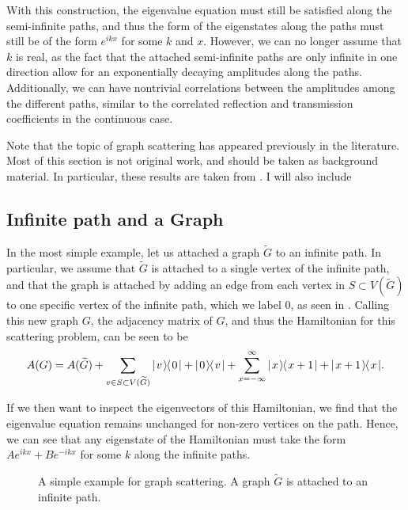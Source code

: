 \documentclass[../thesis-main/thesis-main]{subfiles}
\begin{document}
With this construction, the eigenvalue equation must still be satisfied along the semi-infinite paths, and thus the form of the eigenstates along the paths must still be of the form $e^{i k x}$ for some $k$ and $x$.  However, we can no longer assume that $k$ is real, as the fact that the attached semi-infinite paths are only infinite in one direction allow for an exponentially decaying amplitudes along the paths.  Additionally, we can have nontrivial correlations between the amplitudes among the different paths, similar to the correlated reflection and transmission coefficients in the continuous case.

Note that the topic of graph scattering has appeared previously in the literature.  Most of this section is not original work, and should be taken as background material.  In particular, these results are taken from \cite{FGG08, Chi09, CS11, CG12}.  I will also include 


\subsection{Infinite path and a Graph}\label{sec:infinite_path_and_graph}

In the most simple example, let us attached a graph $\widetilde{G}$ to an infinite path.  In particular, we assume that $\widetilde{G}$ is attached to a single vertex of the infinite path, and that the graph is attached by adding an edge from each vertex in $S\subset V(\widetilde{G})$ to one specific vertex of the infinite path, which we label $0$, as seen in .  Calling this new graph $G$, the adjacency matrix of $G$, and thus the Hamiltonian for this scattering problem, can be seen to be
\begin{equation}
  A(G) = A(\widetilde{G}) + \sum_{v\in S \subset V(\widetilde{G})} |\mspace{2mu} v \mspace{2mu} \rangle\mspace{-2mu}\langle\mspace{2mu} 0 \mspace{2mu} | + |\mspace{2mu} 0 \mspace{2mu} \rangle\mspace{-2mu}\langle\mspace{2mu} v \mspace{2mu} | + \sum_{x=-\infty}^\infty |\mspace{2mu} x \mspace{2mu} \rangle\mspace{-2mu}\langle\mspace{2mu} x+1 \mspace{2mu} | + |\mspace{2mu} x+1 \mspace{2mu} \rangle\mspace{-2mu}\langle\mspace{2mu} x \mspace{2mu} |.
\end{equation}

If we then want to inspect the eigenvectors of this Hamiltonian, we find that the eigenvalue equation remains unchanged for non-zero vertices on the path.  Hence, we can see that any eigenstate of the Hamiltonian must take the form $Ae^{i k x} + Be^{-i k x}$ for some $k$ along the infinite paths.  


\begin{figure}
  \centering
  
  \caption[Simple example for graph scattering]{A simple example for graph scattering.  A graph $\widetilde{G}$ is attached to an infinite path.}
  \label{fig:path_and_graph}
\end{figure}
\end{document}
